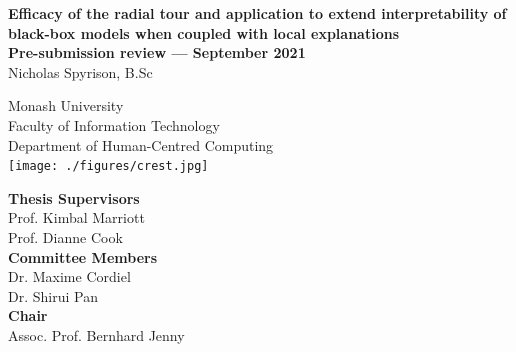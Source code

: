 \documentclass[
  11,
]{article}
\author{}
\date{\vspace{-2.5em}}
\begin{document}

\onehalfspacing
{}

\begin{center}
\huge{\textbf{Efficacy of the radial tour and application to extend interpretability of black-box models when coupled with local explanations}}\\
\vspace*{1\baselineskip}
\Large{\textbf{Pre-submission review --- September 2021}}\\
\LARGE{Nicholas Spyrison, B.Sc}\\
\vspace*{1\baselineskip}

\LARGE{Monash University}\\
\Large{Faculty of Information Technology}\\
\Large{Department of Human-Centred Computing}\\
\vspace*{1\baselineskip}
\texttt{[image: ./figures/crest.jpg]}\\
\vspace*{1\baselineskip}

\Large{\textbf{Thesis Supervisors}}\\
Prof. Kimbal Marriott\\
Prof. Dianne Cook\\
\vspace*{1\baselineskip}
\Large{\textbf{Committee Members}}\\
Dr. Maxime Cordiel\\
Dr. Shirui Pan\\
\vspace*{1\baselineskip}
\Large{\textbf{Chair}}\\
Assoc. Prof. Bernhard Jenny\\
\end{center}

\doublespacing

\newpage
{}

\newpage

% 
\end{document}
